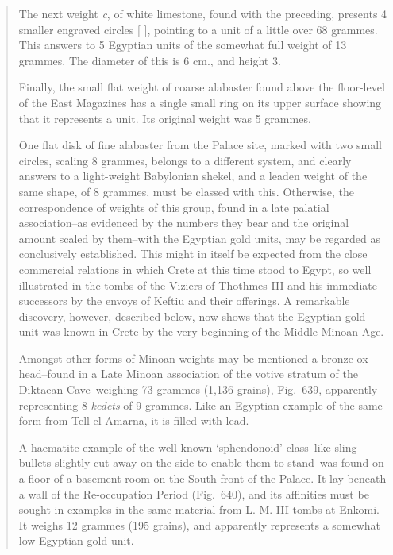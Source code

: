 \documentclass{article}
\begin{document}
\begin{quote}
The next weight {\em c}, of white limestone, found with the preceding,
presents 4 smaller engraved circles [ ], pointing to a unit of a little over
68 grammes. This answers to 5 Egyptian units of the somewhat full
weight of 13 grammes. The diameter of this is 6 cm., and height 3.

Finally, the small flat weight of coarse alabaster found above the floor-level
of the East Magazines has a single small ring on its upper surface
showing that it represents a unit. Its original weight was 5 grammes.

One flat disk of fine alabaster from the Palace site, marked with two
small circles, scaling 8 grammes, belongs to a different system, and clearly
answers to a light-weight Babylonian shekel, and a leaden weight of the
same shape, of 8 grammes, must be classed with this. Otherwise, the
correspondence of weights of this group, found in a late palatial association--as evidenced by the numbers they bear and the original amount
scaled by them--with the Egyptian gold units, may be regarded as
conclusively established. This might in itself be expected from the close
commercial relations in which Crete at this time stood to Egypt, so well
illustrated in the tombs of the Viziers of Thothmes III and his immediate
successors by the envoys of Keftiu and their offerings. A remarkable
discovery, however, described below, now shows that the Egyptian gold
unit was known in Crete by the very beginning of the Middle Minoan Age.

Amongst other forms of Minoan weights may be mentioned a bronze
ox-head--found in a Late Minoan association of the votive stratum of the
Diktaean Cave--weighing  73 grammes (1,136 grains), Fig.~639, apparently
representing 8 {\em kedets} of 9 
grammes. Like an Egyptian example of the same form
from Tell-el-Amarna, it is filled with lead.

A haematite example of the well-known `sphendonoid' class--like sling
bullets slightly cut away on the side to enable them to stand--was found on a floor of a basement
room on the South front of the Palace. It lay beneath a wall of the
Re-occupation Period (Fig.~640), and its affinities must be sought in
examples in the same material from L. M. III tombs at Enkomi. It
weighs 12 grammes (195 grains), and apparently represents a somewhat
low Egyptian gold unit.
\end{quote}
\end{document}
